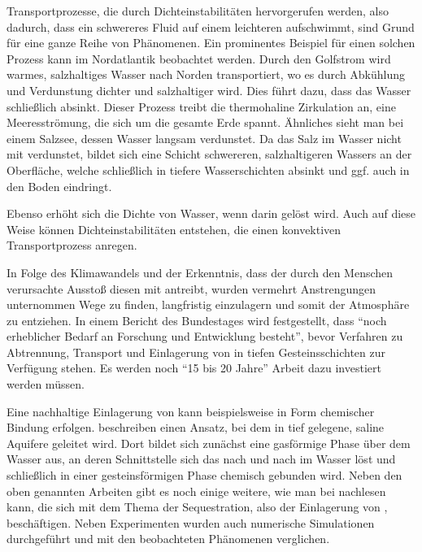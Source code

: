 
\label{cha:intro}


Transportprozesse, die durch Dichteinstabilitäten hervorgerufen werden, also dadurch, dass ein schwereres Fluid auf einem leichteren aufschwimmt, sind Grund für eine ganze Reihe von Phänomenen.
Ein prominentes Beispiel für einen solchen Prozess kann im Nordatlantik beobachtet werden. Durch den Golfstrom wird warmes, salzhaltiges Wasser nach Norden transportiert, wo es durch Abkühlung und Verdunstung dichter und salzhaltiger wird. Dies führt dazu, dass das Wasser schließlich absinkt. Dieser Prozess treibt die thermohaline Zirkulation an, eine Meeresströmung, die sich um die gesamte Erde spannt. 
Ähnliches sieht man bei einem Salzsee, dessen Wasser langsam verdunstet. Da das Salz im Wasser nicht mit verdunstet, bildet sich eine Schicht schwereren, salzhaltigeren Wassers an der Oberfläche, welche schließlich in tiefere Wasserschichten absinkt und ggf. auch in den Boden eindringt.

Ebenso erhöht sich die Dichte von Wasser, wenn \COT darin gelöst wird. Auch auf diese Weise können Dichteinstabilitäten entstehen, die einen konvektiven Transportprozess anregen.

In Folge des Klimawandels und der Erkenntnis, dass der durch den Menschen verursachte \COTm Ausstoß diesen mit antreibt, wurden vermehrt Anstrengungen unternommen Wege zu finden, \COT langfristig einzulagern und somit der Atmosphäre zu entziehen. 
In einem Bericht des Bundestages \citep{taccs} wird festgestellt, dass "`noch erheblicher Bedarf an Forschung und Entwicklung besteht"', bevor Verfahren zu Abtrennung, Transport und Einlagerung von \COT in tiefen Gesteinsschichten zur Verfügung stehen. Es werden noch "`15 bis 20 Jahre"' Arbeit dazu investiert werden müssen.

Eine nachhaltige Einlagerung von \COT kann beispielsweise in Form chemischer Bindung erfolgen. \cite{kneafsy} beschreiben einen Ansatz, bei dem \COT in tief gelegene, saline Aquifere geleitet wird. Dort bildet sich zunächst eine gasförmige Phase über dem Wasser aus, an deren Schnittstelle sich das \COT nach und nach im Wasser löst und schließlich in einer gesteinsförmigen Phase chemisch gebunden wird.  Neben den oben genannten Arbeiten gibt es noch einige weitere, wie man bei \cite{kneafsy} nachlesen kann, die sich mit dem Thema der \COTm Sequestration, also der Einlagerung von \COTn, beschäftigen. Neben Experimenten wurden auch numerische Simulationen durchgeführt und mit den beobachteten Phänomenen verglichen. 

